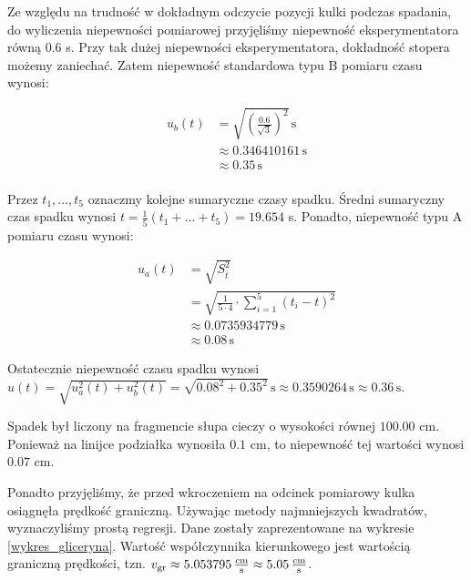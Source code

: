 \documentclass[a4paper]{article}
\newlength{\du}
\begin{document}
Ze względu na trudność w dokładnym odczycie pozycji kulki podczas spadania, do wyliczenia niepewności pomiarowej przyjęliśmy niepewność eksperymentatora równą $0.6$ s.
Przy tak dużej niepewności eksperymentatora, dokładność stopera możemy zaniechać.
Zatem niepewność standardowa typu B pomiaru czasu wynosi:

\begin{align*}
	u_b(t) &= \sqrt{\left(\frac{0.6}{\sqrt 3}\right)^2} \, \text{s} \\
	&\approx 0.346410161 \, \text{s} \\
	&\approx 0.35 \, \text{s} \\
\end{align*}

Przez $t_1, \dots, t_5$ oznaczmy kolejne sumaryczne czasy spadku.
Średni sumaryczny czas spadku wynosi $t = \frac 1 5 (t_1 + \dots + t_5) = 19.654$ s.
Ponadto, niepewność typu A pomiaru czasu wynosi:

\begin{align*}
	u_a(t) &= \sqrt{S^{2}_{\overline{t}}} \\
	&= \sqrt{\frac{1}{5 \cdot 4} \cdot \sum_{i=1}^{5} (t_i - t)^2} \\
	&\approx 0.0735934779 \, \text{s} \\
	&\approx 0.08 \, \text{s}
\end{align*}

Ostatecznie niepewność czasu spadku wynosi $u(t) = \sqrt{u_a^2(t) + u_b^2(t)} = \sqrt{0.08^2 + 0.35^2} \, \text{s} \approx 0.3590264 \, \text{s} \approx 0.36\, \text{s}$.

Spadek był liczony na fragmencie słupa cieczy o wysokości równej $100.00$ cm.
Ponieważ na linijce podziałka wynosiła $0.1$ cm, to niepewność tej wartości wynosi $0.07$ cm.

Ponadto przyjęliśmy, że przed wkroczeniem na odcinek pomiarowy kulka osiągnęła prędkość graniczną.
Używając metody najmniejszych kwadratów, wyznaczyliśmy prostą regresji.
Dane zostały zaprezentowane na wykresie \ref{wykres_gliceryna}.
Wartość współczynnika kierunkowego jest wartością graniczną prędkości, tzn.
$v_{\text{gr}} \approx 5.053795 \, \frac{\text{cm}}{\text{s}} \approx 5.05 \, \frac{\text{cm}}{\text{s}}$.
\end{document}
